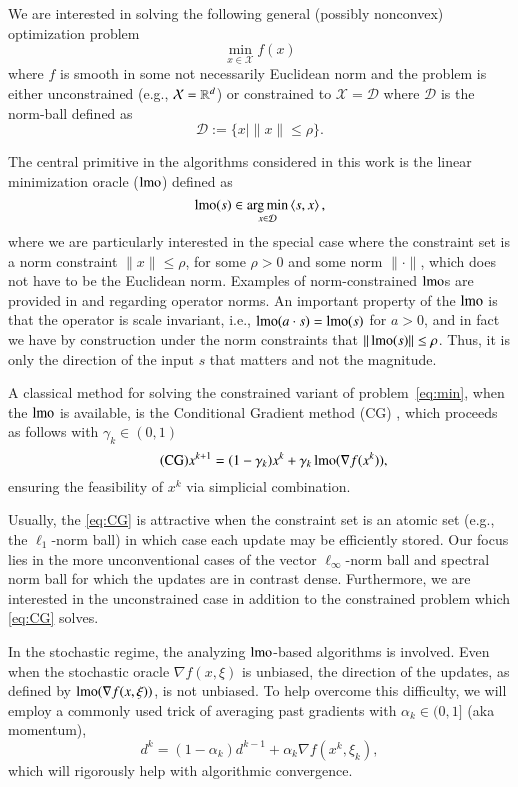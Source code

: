 We are interested in solving the following general (possibly nonconvex) optimization problem
\begin{equation}\label{eq:min}
\min_{x \in \mathcal X} f(x)
\end{equation}
where $f$ is smooth in some not necessarily Euclidean norm and the problem is either unconstrained (e.g., $\mathcal X = \mathbb{R}^d$) or constrained to $\mathcal X = \mathcal D$ where $\mathcal D$ is the norm-ball defined as
\begin{equation*}
\mathcal D := \{ x \mid \|x\| \leq \rho \}.
\end{equation*} 

The central primitive in the algorithms considered in this work is the linear minimization oracle ($\operatorname{lmo}$) defined as
\begin{equation}\label{eq:lmo}
\operatorname{lmo}(s) \in \operatorname*{arg\,min}_{x \in \mathcal D} \braket{s,x},
\end{equation}
where we are particularly interested in the special case where the constraint set is a norm constraint $\|x\|\le \rho$, 
for some $\rho > 0$ and some norm $\|\cdot\|$, which does not have to be the Euclidean norm.
Examples of norm-constrained $\operatorname{lmo}$s are provided in  and  regarding operator norms.
An important property of the $\operatorname{lmo}$ is that the operator is scale invariant, i.e., $\operatorname{lmo}(a\cdot s)=\operatorname{lmo}(s)$ for $a>0$, and in fact we have by construction under the norm constraints that $\|\operatorname{lmo}(s)\|\leq\rho$.
Thus, it is only the direction of the input $s$ that matters and not the magnitude.

A classical method for solving the constrained variant of problem~\ref{eq:min}, when the $\operatorname{lmo}$ is available, is the Conditional Gradient method (CG) \citep{frank1956algorithm,ken-fw,jaggi2013revisiting}, which proceeds as follows with $\gamma_k\in(0,1)$
\begin{equation*}\label{eq:CG}
\tag{CG}
x^{k+1} = (1-\gamma_k) x^k + \gamma_k \operatorname{lmo}(\nabla f(x^k)),
\end{equation*}
ensuring the feasibility of $x^k$ via simplicial combination.



Usually, the \ref{eq:CG} is attractive when the constraint set is an atomic set (e.g., the $\ell_1$-norm ball) in which case each update may be efficiently stored.
Our focus  lies in the more unconventional cases of the vector $\ell_\infty$-norm ball and spectral norm ball for which the updates are in contrast dense.
Furthermore, we are interested in the unconstrained case in addition to the constrained problem which \ref{eq:CG} solves.

In the stochastic regime, the analyzing $\operatorname{lmo}$-based algorithms is involved. 
Even when the stochastic oracle $\nabla f(x, \xi)$ is unbiased, the direction of the updates, as defined by $\operatorname{lmo}(\nabla f(x, \xi))$, is not unbiased.
To help overcome this difficulty, we will employ a commonly used trick of averaging past gradients with $\alpha_k \in (0,1]$ (aka momentum),
\begin{equation}
d^k = (1-\alpha_k)d^{k-1} + \alpha_k \nabla f(x^k, \xi_k),
\end{equation}
which will rigorously help with algorithmic convergence. 
